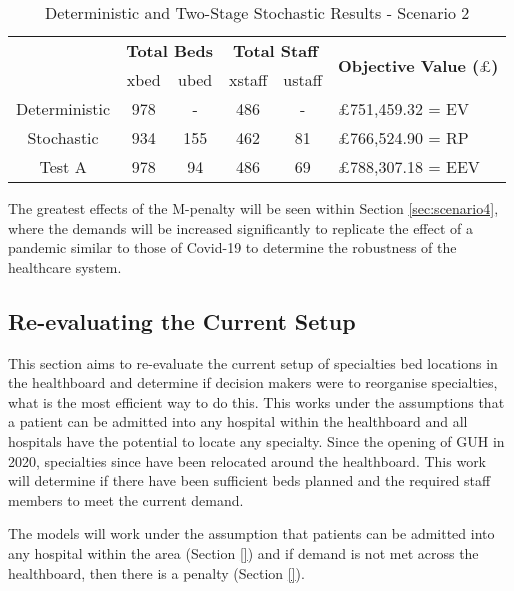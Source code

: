 \documentclass[../thesis.tex]{subfiles}
\begin{document}
\begin{table}[h!]
    \centering
    \begin{tabular}{cccccl}\toprule
 & \multicolumn{2}{l}{\textbf{Total Beds}} & \multicolumn{2}{c}{\textbf{Total Staff}} & \multirow{2}{*}{\textbf{Objective Value ($\pounds$)}}\\ \cmidrule(lr){2-3} \cmidrule(lr){4-5}
         
 & xbed           & ubed          & xstaff         & ustaff         \\ \midrule
 Deterministic & 978  & - & 486 & - &$\pounds$751,459.32 = EV \\
 Stochastic & 934 & 155 & 462 & 81 & $\pounds$766,524.90 = RP \\
 Test A & 978 & 94 & 486 & 69 & $\pounds$788,307.18 = EEV \\\bottomrule
    \end{tabular}
    \caption{Deterministic and Two-Stage Stochastic Results - Scenario 2}
    \label{tab:Scenario2Results}
\end{table}


The greatest effects of the M-penalty will be seen within Section \ref{sec:scenario4}, where the demands will be increased significantly to replicate the effect of a pandemic similar to those of Covid-19 to determine the robustness of the healthcare system.

\subsection{Re-evaluating the Current Setup}\label{sec:scenario3}
This section aims to re-evaluate the current setup of specialties bed locations in the healthboard and determine if decision makers were to reorganise specialties, what is the most efficient way to do this. This works under the assumptions that a patient can be admitted into any hospital within the healthboard and all hospitals have the potential to locate any specialty. Since the opening of GUH in 2020, specialties since have been relocated around the healthboard. This work will determine if there have been sufficient beds planned and the required staff members to meet the current demand.

The models will work under the assumption that patients can be admitted into any hospital within the area (Section \ref{}) and if demand is not met across the healthboard, then there is a penalty (Section \ref{}).
\end{document}
